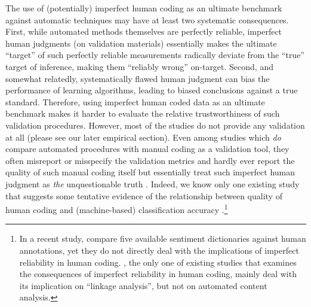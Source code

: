 \documentclass[man, 12pt, a4paper, nolmodern, noextraspace]{apa6}
\begin{document}
    The use of (potentially) imperfect human coding as an ultimate benchmark against automatic techniques may have at least two systematic consequences. First, while automated methods themselves are perfectly reliable, imperfect human judgments (on validation materials) essentially makes the ultimate \enquote{target} of such perfectly reliable measurements radically deviate from the \enquote{true} target of inference, making them \enquote{reliably wrong} on-target. Second, and somewhat relatedly, systematically flawed human judgment can bias the performance of learning algorithms, leading to biased conclusions against a true standard. Therefore, using imperfect human coded data as an ultimate benchmark makes it harder to evaluate the relative trustworthiness of such validation procedures. However, most of the studies do not provide any validation at all (please see our later empirical section). Even among studies which \textit{do} compare automated procedures with manual coding as a validation tool, they often misreport or misspecify the validation metrics and hardly ever report the quality of such manual coding itself but essentially treat such imperfect human judgment as \textit{the} unquestionable truth \parencites[e.g.,][]{gonzalez2015signals, lowe2013validating, YoungSoroka2012}. Indeed, we know only one existing study that suggests some tentative evidence of the relationship between quality of human coding and (machine-based) classification accuracy \parencite{burscher2014teaching}.\footnote{ In a recent study, \textcite{gonzalez2015signals} compare five available sentiment dictionaries against human annotations, yet they do not directly deal with the implications of imperfect reliability in human coding. \textcite{scharkow2017measurement}, the only one of existing studies that examines the consequences of imperfect reliability in human coding, mainly deal with its implication on \enquote{linkage analysis}, but not on automated content analysis.}     
   
\end{document}

